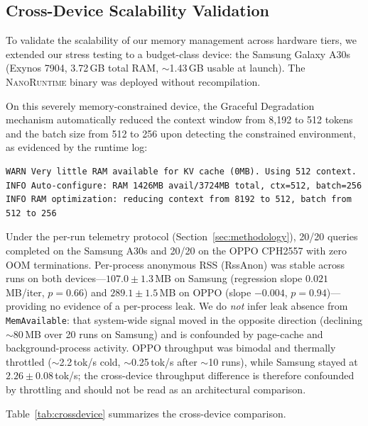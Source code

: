 \documentclass[11pt]{article}
\newcommand{\nanort}{\textsc{NanoRuntime}}
\begin{document}
\subsection{Cross-Device Scalability Validation}
\label{sec:cross_device}

To validate the scalability of our memory management across hardware tiers,
we extended our stress testing to a budget-class device: the Samsung Galaxy
A30s (Exynos 7904, 3.72\,GB total RAM, $\sim$1.43\,GB usable at launch).
The \nanort{} binary was deployed without recompilation.

On this severely memory-constrained device, the Graceful Degradation mechanism
automatically reduced the context window from 8,192 to 512 tokens and the
batch size from 512 to 256 upon detecting the constrained environment,
as evidenced by the runtime log:

\begin{verbatim}
WARN Very little RAM available for KV cache (0MB). Using 512 context.
INFO Auto-configure: RAM 1426MB avail/3724MB total, ctx=512, batch=256
INFO RAM optimization: reducing context from 8192 to 512, batch from 512 to 256
\end{verbatim}

Under the per-run telemetry protocol (Section~\ref{sec:methodology}), 20/20
queries completed on the Samsung A30s and 20/20 on the OPPO CPH2557 with zero
OOM terminations. Per-process anonymous RSS (RssAnon) was stable across runs
on both devices---$107.0\pm1.3$\,MB on Samsung (regression slope
$0.021$\,MB/iter, $p{=}0.66$) and $289.1\pm1.5$\,MB on OPPO (slope $-0.004$,
$p{=}0.94$)---providing no evidence of a per-process leak. We do \emph{not}
infer leak absence from \texttt{MemAvailable}: that system-wide signal moved in
the opposite direction (declining $\sim$80\,MB over 20 runs on Samsung) and is
confounded by page-cache and background-process activity. OPPO throughput was
bimodal and thermally throttled ($\sim$2.2\,tok/s cold, $\sim$0.25\,tok/s after
$\sim$10 runs), while Samsung stayed at $2.26\pm0.08$\,tok/s; the cross-device
throughput difference is therefore confounded by throttling and should not be
read as an architectural comparison.

Table~\ref{tab:crossdevice} summarizes the cross-device comparison.
\end{document}
